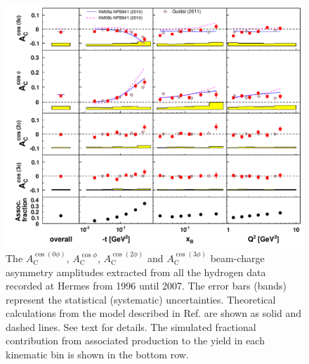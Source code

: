 \begin{figure}
  \begin{center}
    \includegraphics[width=15cm]{bcaplots_eml_par13_bin6_all_release_pic_cluster_update_withassoc}
    \caption{The $A_{\textrm{C}}^{\cos(0\phi)}$, $A_{\textrm{C}}^{\cos\phi}$, $A_{\textrm{C}}^{\cos(2\phi)}$ and $A_{\textrm{C}}^{\cos(3\phi)}$ beam-charge asymmetry amplitudes extracted from all the hydrogen data recorded at H{\sc ermes} from 1996 until 2007. The error bars (bands) represent the statistical (systematic) uncertainties.  Theoretical calculations from the model described in Ref. \cite{Kum09} are shown as solid and dashed lines. See text for details. The simulated fractional contribution from associated production to the yield in each kinematic bin is shown in the bottom row.}
  \label{bca_xbjrange}
 \end{center}
\end{figure}

